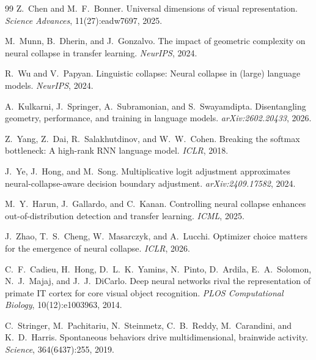 \documentclass{article}
\begin{document}
\begin{thebibliography}{99}
Z.~Chen and M.~F.~Bonner.
\newblock Universal dimensions of visual representation.
\newblock \emph{Science Advances}, 11(27):eadw7697, 2025.

M.~Munn, B.~Dherin, and J.~Gonzalvo.
\newblock The impact of geometric complexity on neural collapse in transfer learning.
\newblock \emph{NeurIPS}, 2024.

R.~Wu and V.~Papyan.
\newblock Linguistic collapse: Neural collapse in (large) language models.
\newblock \emph{NeurIPS}, 2024.

A.~Kulkarni, J.~Springer, A.~Subramonian, and S.~Swayamdipta.
\newblock Disentangling geometry, performance, and training in language models.
\newblock \emph{arXiv:2602.20433}, 2026.

Z.~Yang, Z.~Dai, R.~Salakhutdinov, and W.~W.~Cohen.
\newblock Breaking the softmax bottleneck: A high-rank {RNN} language model.
\newblock \emph{ICLR}, 2018.

J.~Ye, J.~Hong, and M.~Song.
\newblock Multiplicative logit adjustment approximates neural-collapse-aware decision boundary adjustment.
\newblock \emph{arXiv:2409.17582}, 2024.

M.~Y.~Harun, J.~Gallardo, and C.~Kanan.
\newblock Controlling neural collapse enhances out-of-distribution detection and transfer learning.
\newblock \emph{ICML}, 2025.

J.~Zhao, T.~S.~Cheng, W.~Masarczyk, and A.~Lucchi.
\newblock Optimizer choice matters for the emergence of neural collapse.
\newblock \emph{ICLR}, 2026.

C.~F.~Cadieu, H.~Hong, D.~L.~K.~Yamins, N.~Pinto, D.~Ardila, E.~A.~Solomon, N.~J.~Majaj, and J.~J.~DiCarlo.
\newblock Deep neural networks rival the representation of primate {IT} cortex for core visual object recognition.
\newblock \emph{PLOS Computational Biology}, 10(12):e1003963, 2014.

C.~Stringer, M.~Pachitariu, N.~Steinmetz, C.~B.~Reddy, M.~Carandini, and K.~D.~Harris.
\newblock Spontaneous behaviors drive multidimensional, brainwide activity.
\newblock \emph{Science}, 364(6437):255, 2019.


\end{thebibliography}
\end{document}

